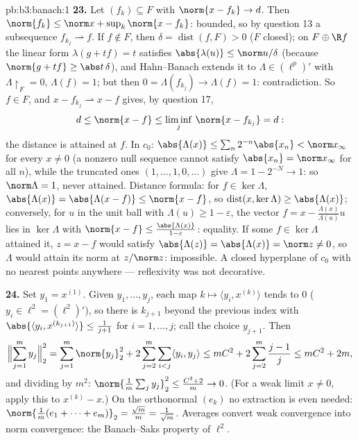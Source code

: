 \begin{solution}{pb:b3:banach:1}
\textbf{23.} Let $(f_k) \subseteq F$ with $\norm{x - f_k}
\to d$. Then $\norm{f_k} \leq \norm x + \sup_k\norm{x -
f_k}$: bounded, so by question 13 a subsequence $f_{k_j}
\rightharpoonup f$. If $f \notin F$, then $\delta =
\operatorname{dist}(f, F) > 0$ ($F$ closed); on $F \oplus \R
f$ the linear form $\lambda(g + tf) = t$ satisfies
$\abs{\lambda(u)} \leq \norm u/\delta$ (because $\norm{g +
tf} \geq \abs t\,\delta$), and Hahn--Banach extends it to
$\Lambda \in (\ell^p)'$ with $\Lambda\restriction_F = 0$,
$\Lambda(f) = 1$; but then $0 = \Lambda(f_{k_j}) \to
\Lambda(f) = 1$: contradiction. So $f \in F$, and $x -
f_{k_j} \rightharpoonup x - f$ gives, by question 17,
\[
d \leq \norm{x - f} \leq \liminf_j\,\norm{x - f_{k_j}} = d :
\]
the distance is attained at $f$. In $c_0$: $\abs{\Lambda(x)}
\leq \sum_n2^{-n}\abs{x_n} < \norm x_\infty$ for every $x
\neq 0$ (a nonzero null sequence cannot satisfy $\abs{x_n} =
\norm x_\infty$ for all $n$), while the truncated ones $(1,
\dots, 1, 0, \dots)$ give $\Lambda = 1 - 2^{-N} \to 1$: so
$\norm\Lambda = 1$, never attained. Distance formula: for $f
\in \ker\Lambda$, $\abs{\Lambda(x)} = \abs{\Lambda(x - f)}
\leq \norm{x - f}$, so $\operatorname{dist}(x, \ker\Lambda)
\geq \abs{\Lambda(x)}$; conversely, for $u$ in the unit ball
with $\Lambda(u) \geq 1 - \varepsilon$, the vector $f = x -
\frac{\Lambda(x)}{\Lambda(u)}u$ lies in $\ker\Lambda$ with
$\norm{x - f} \leq \frac{\abs{\Lambda(x)}}{1 - \varepsilon}$:
equality. If some $f \in \ker\Lambda$ attained it, $z = x -
f$ would satisfy $\abs{\Lambda(z)} = \abs{\Lambda(x)} =
\norm z \neq 0$, so $\Lambda$ would attain its norm at
$z/\norm z$: impossible. A closed hyperplane of $c_0$ with no
nearest points anywhere --- reflexivity was not decorative.

\textbf{24.} Set $y_1 = x^{(1)}$. Given $y_1, \dots, y_j$,
each map $k \mapsto \langle y_i, x^{(k)}\rangle$ tends to $0$
($y_i \in \ell^2 = (\ell^2)'$), so there is $k_{j+1}$ beyond
the previous index with $\abs{\langle y_i,
x^{(k_{j+1})}\rangle} \leq \frac1{j+1}$ for $i = 1, \dots,
j$; call the choice $y_{j+1}$. Then
\[
\Bigl\lVert\sum_{j=1}^my_j\Bigr\rVert_2^2
= \sum_{j=1}^m\norm{y_j}_2^2
+ 2\sum_{j=2}^m\sum_{i<j}\langle y_i, y_j\rangle
\leq mC^2 + 2\sum_{j=2}^m\frac{j-1}j
\leq mC^2 + 2m,
\]
and dividing by $m^2$: $\norm{\frac1m\sum_jy_j}_2^2 \leq
\frac{C^2 + 2}m \to 0$. (For a weak limit $x \neq 0$, apply
this to $x^{(k)} - x$.) On the orthonormal $(e_k)$ no
extraction is even needed: $\norm{\frac1m(e_1 + \dots +
e_m)}_2 = \frac{\sqrt m}m = \frac1{\sqrt m}$. Averages
convert weak convergence into norm convergence: the
Banach--Saks property of $\ell^2$.


\end{solution}
